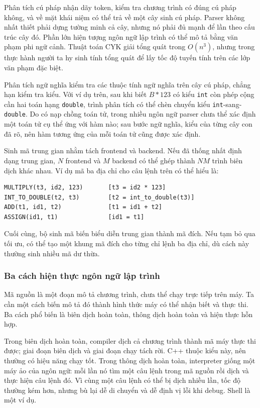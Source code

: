 \documentclass[11pt]{article}
\begin{document}
Phân tích cú pháp nhận dãy token, kiểm tra chương trình có đúng cú pháp không,
và về mặt khái niệm có thể trả về một cây sinh cú pháp. Parser không nhất thiết
phải dựng tường minh cả cây, nhưng nó phải đủ mạnh để lần theo cấu trúc cây đó.
Phần lớn hiện tượng ngôn ngữ lập trình có thể mô tả bằng văn phạm phi ngữ cảnh.
Thuật toán CYK giải tổng quát trong \(O(n^3)\), nhưng trong thực hành người ta
hy sinh tính tổng quát để lấy tốc độ tuyến tính trên các lớp văn phạm đặc biệt.

Phân tích ngữ nghĩa kiểm tra các thuộc tính ngữ nghĩa trên cây cú pháp, chẳng
hạn kiểm tra kiểu. Với ví dụ trên, sau khi biết \(B*123\) có kiểu \texttt{int}
còn phép cộng cần hai toán hạng \texttt{double}, trình phân tích có thể chèn
chuyển kiểu \texttt{int}-sang-\texttt{double}. Do có nạp chồng toán tử, trong
nhiều ngôn ngữ parser chưa thể xác định một toán tử cụ thể ứng với hàm nào; sau
bước ngữ nghĩa, kiểu của từng cây con đã rõ, nên hàm tương ứng của mỗi toán tử
cũng được xác định.

Sinh mã trung gian nhằm tách frontend và backend. Nếu đã thống nhất định dạng
trung gian, \(N\) frontend và \(M\) backend có thể ghép thành \(NM\) trình biên
dịch khác nhau. Ví dụ mã ba địa chỉ cho câu lệnh trên có thể hiểu là:

\begin{verbatim}
MULTIPLY(t3, id2, 123)       [t3 = id2 * 123]
INT_TO_DOUBLE(t2, t3)        [t2 = int_to_double(t3)]
ADD(t1, id1, t2)             [t1 = id1 + t2]
ASSIGN(id1, t1)              [id1 = t1]
\end{verbatim}

Cuối cùng, bộ sinh mã biến biểu diễn trung gian thành mã đích. Nếu tạm bỏ qua
tối ưu, có thể tạo một khung mã đích cho từng chỉ lệnh ba địa chỉ, dù cách này
thường sinh nhiều mã dư thừa.

\subsubsection{Ba cách hiện thực ngôn ngữ lập trình}

Mã nguồn là một đoạn mô tả chương trình, chưa thể chạy trực tiếp trên máy. Ta
cần một cách biến mô tả đó thành hình thức máy có thể nhận biết và thực thi.
Ba cách phổ biến là biên dịch hoàn toàn, thông dịch hoàn toàn và hiện thực hỗn
hợp.

Trong biên dịch hoàn toàn, compiler dịch cả chương trình thành mã máy thực thi
được; giai đoạn biên dịch và giai đoạn chạy tách rời. C++ thuộc kiểu này, nên
thường có hiệu năng chạy tốt. Trong thông dịch hoàn toàn, interpreter giống một
máy ảo của ngôn ngữ: mỗi lần nó tìm một câu lệnh trong mã nguồn rồi dịch và
thực hiện câu lệnh đó. Vì cùng một câu lệnh có thể bị dịch nhiều lần, tốc độ
thường kém hơn, nhưng bù lại dễ di chuyển và dễ định vị lỗi khi debug. Shell là
một ví dụ.
\end{document}
